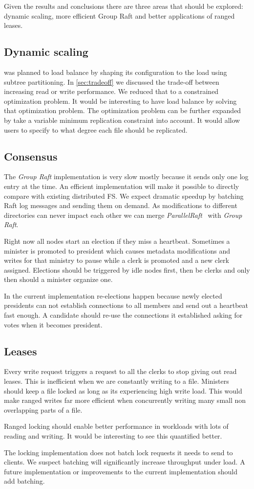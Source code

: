 Given the results and conclusions there are three areas that should be explored: dynamic scaling, more efficient Group Raft and better applications of ranged leases.

\subsection{Dynamic scaling}
\Name was planned to load balance by shaping its configuration to the load using subtree partitioning. In \cref{sec:tradeoff} we discussed the trade-off between increasing read or write performance. We reduced that to a constrained optimization problem. It would be interesting to have \name{} load balance by solving that optimization problem. The optimization problem can be further expanded by take a variable minimum replication constraint into account. It would allow users to specify to what degree each file should be replicated.

\subsection{Consensus}
The \textit{Group Raft} implementation is very slow mostly because it sends only one log entry at the time. An efficient implementation will make it possible to directly compare \name{} with existing distributed FS. We expect dramatic speedup by batching Raft log messages and sending them on demand. As modifications to different directories can never impact each other we can merge \textit{ParallelRaft}~\cite{polarfs} with \textit{Group Raft}.

Right now all nodes start an election if they miss a heartbeat. Sometimes a minister is promoted to president which causes metadata modifications and writes for that ministry to pause while a clerk is promoted and a new clerk assigned. Elections should be triggered by idle nodes first, then be clerks and only then should a minister organize one. 

In the current implementation re-elections happen because newly elected presidents can not establish connections to all members and send out a heartbeat fast enough. A candidate should re-use the connections it established asking for votes when it becomes president.

\subsection{Leases}
Every write request triggers a request to all the clerks to stop giving out read leases. This is inefficient when we are constantly writing to a file. Ministers should keep a file locked as long as its experiencing high write load. This would make ranged writes far more efficient when concurrently writing many small non overlapping parts of a file.

Ranged locking should enable better performance in workloads with lots of reading and writing. It would be interesting to see this quantified better.

The locking implementation does not batch lock requests it needs to send to clients. We suspect batching will significantly increase throughput under load. A future implementation or improvements to the current implementation should add batching.
